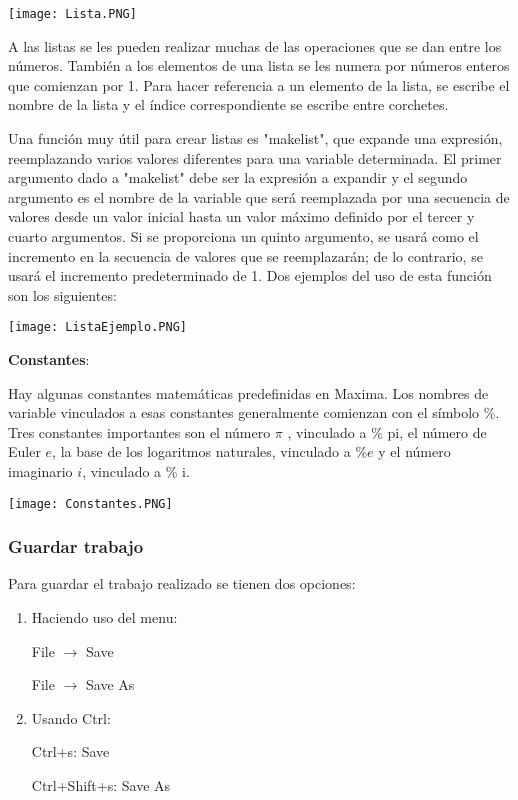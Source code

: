 \documentclass{article}
\begin{document}
\begin{center}
\texttt{[image: Lista.PNG]}
\end{center}

A las listas se les pueden realizar muchas de las operaciones que se dan entre los números. También a los elementos de una lista se les numera por números enteros que comienzan por 1. Para hacer referencia a un elemento de la lista, se escribe el nombre de la lista y el índice correspondiente se escribe entre corchetes.

Una función muy útil para crear listas es "makelist", que expande una expresión, reemplazando varios valores diferentes para una variable determinada. El primer argumento dado a "makelist" debe ser la expresión a expandir y el segundo argumento es el nombre de la variable que será reemplazada por una secuencia de valores desde un valor inicial hasta un valor máximo definido por el tercer y cuarto argumentos. Si se proporciona un quinto argumento, se usará como el incremento en la secuencia de valores que se reemplazarán; de lo contrario, se usará el incremento predeterminado de 1. Dos ejemplos del uso de esta función son los siguientes:

\begin{center}
\texttt{[image: ListaEjemplo.PNG]}
\end{center}
 
\textbf{Constantes}:

Hay algunas constantes matemáticas predefinidas en Maxima. Los nombres de variable vinculados a esas constantes generalmente comienzan con el  símbolo $\%$. Tres constantes importantes son el número $\pi$ , vinculado a $\%$ pi, el número de Euler $e$, la base de los logaritmos naturales, vinculado a $\% e$ y el número imaginario $i$, vinculado a $\%$ i.

\begin{center}
\texttt{[image: Constantes.PNG]}
\end{center}

\subsubsection{Guardar trabajo}
Para guardar el trabajo realizado se tienen dos opciones:

\begin{enumerate}
\item Haciendo uso del menu:

\centerline {File $\longrightarrow$ Save}
\centerline {File $\longrightarrow$ Save As}

\item Usando Ctrl:

\centerline {Ctrl+s: Save}
\centerline {Ctrl+Shift+s: Save As}
\end{enumerate}
\end{document}
